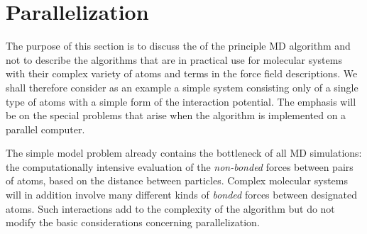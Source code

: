 \section{Parallelization}
\label{sec:par}

\newcommand{\abs}[1]{\mid \! {#1} \! \mid}

The purpose of this section is to discuss the 
 of the 
principle MD algorithm and not to describe the algorithms that are in 
practical use for molecular systems with their complex variety of atoms 
and terms in the force field descriptions. We shall therefore consider 
as an example a simple system consisting only of a single type of atoms 
with a simple form of the interaction potential. The emphasis will be 
on the special problems that arise when the algorithm is implemented on 
a parallel computer. 

The simple model problem already contains the bottleneck of all MD 
simulations: the computationally intensive evaluation of the 
{\em non-bonded} forces between pairs of atoms, based on the distance 
between particles. Complex molecular systems will in addition 
involve many different kinds of {\em bonded} forces between designated 
atoms. Such interactions add to the complexity of the algorithm but do 
not modify the basic considerations concerning parallelization.


